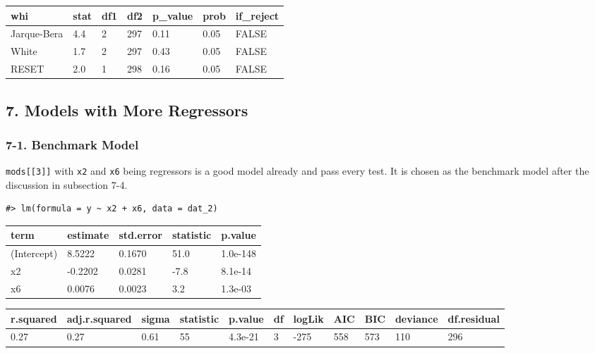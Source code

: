 \documentclass[main.tex]{subfiles}
\begin{document}
\begin{table}[H]
\centering
\begin{tabular}{lllllll}
\toprule
whi & stat & df1 & df2 & p\_value & prob & if\_reject\\
\midrule
Jarque-Bera & 4.4 & 2 & 297 & 0.11 & 0.05 & FALSE\\
White & 1.7 & 2 & 297 & 0.43 & 0.05 & FALSE\\
RESET & 2.0 & 1 & 298 & 0.16 & 0.05 & FALSE\\
\bottomrule
\end{tabular}
\end{table}

\hypertarget{models-with-more-regressors}{%
\subsection{7. Models with More
Regressors}\label{models-with-more-regressors}}

\hypertarget{benchmark-model}{%
\subsubsection{7-1. Benchmark Model}\label{benchmark-model}}

\texttt{mods{[}{[}3{]}{]}} with \texttt{x2} and \texttt{x6} being
regressors is a good model already and pass every test. It is chosen as
the benchmark model after the discussion in subsection 7-4.

\begin{verbatim}
#> lm(formula = y ~ x2 + x6, data = dat_2)
\end{verbatim}

\begin{table}[H]
\centering
\begin{tabular}{lllll}
\toprule
term & estimate & std.error & statistic & p.value\\
\midrule
(Intercept) & 8.5222 & 0.1670 & 51.0 & 1.0e-148\\
x2 & -0.2202 & 0.0281 & -7.8 & 8.1e-14\\
x6 & 0.0076 & 0.0023 & 3.2 & 1.3e-03\\
\bottomrule
\end{tabular}
\end{table}

\begin{table}[H]
\centering
\begin{tabular}{lllllllllll}
\toprule
r.squared & adj.r.squared & sigma & statistic & p.value & df & logLik & AIC & BIC & deviance & df.residual\\
\midrule
0.27 & 0.27 & 0.61 & 55 & 4.3e-21 & 3 & -275 & 558 & 573 & 110 & 296\\
\bottomrule
\end{tabular}
\end{table}
\end{document}
